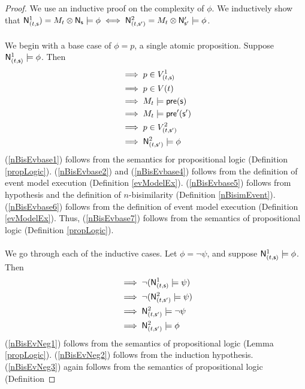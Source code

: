 \begin{proof}
We use an inductive proof on the complexity of $\phi$.
We inductively show that $\mathrm{\mathsf{N}}^1_{(t,\mathrm{\mathsf{s}}}) = M_t \otimes \mathrm{\mathsf{N}}_\mathrm{\mathsf{s}} \models \phi \iff \mathrm{\mathsf{N}}^2_{(t,\mathrm{\mathsf{s}}')} = M_t \otimes
\mathrm{\mathsf{N}}'_{\mathrm{\mathsf{s}}'} \models \phi$.\\
\\
We begin with a base case of $\phi = p$, a single atomic proposition.
Suppose $\mathrm{\mathsf{N}}^1_{(t,\mathrm{\mathsf{s}})} \models \phi$.
Then
\begin{align}
	& \implies p \in V^1_{(t,\mathrm{\mathsf{s}})} \label{nBisEvbase1} \\
	& \implies p \in V(t) \label{nBisEvbase2} \\
	& \implies M_t \models \mathrm{\mathsf{pre}}(\mathrm{\mathsf{s}}) \label{nBisEvbase4} \\
	& \implies M_t \models \mathrm{\mathsf{pre}}'(\mathrm{\mathsf{s}}') \label{nBisEvbase5} \\
	& \implies p \in V^2_{(t,\mathrm{\mathsf{s}}')} \label{nBisEvbase6}\\
	& \implies \mathrm{\mathsf{N}}^2_{(t,\mathrm{\mathsf{s}}')} \models \phi \label{nBisEvbase7}
\end{align}
(\ref{nBisEvbase1}) follows from the semantics for propositional logic (Definition \ref{propLogic}).
(\ref{nBisEvbase2}) and (\ref{nBisEvbase4}) follows from the definition of event model execution (Definition
\ref{evModelEx}).
(\ref{nBisEvbase5}) follows from hypothesis and the definition of $n$-bisimilarity (Definition
\ref{nBisimEvent}).
(\ref{nBisEvbase6}) follows from the definition of event model execution (Definition
\ref{evModelEx}).
Thus, (\ref{nBisEvbase7}) follows from the semantics of propositional logic (Definition
\ref{propLogic}).\\
\\
We go through each of the inductive cases.
Let $\phi = \neg \psi$, and suppose $\mathrm{\mathsf{N}}^1_{(t,\mathrm{\mathsf{s}})} \models \phi$.
Then
\begin{align}
	& \implies \neg (\mathrm{\mathsf{N}}^1_{(t,\mathrm{\mathsf{s}})} \models \psi) \label{nBisEvNeg1} \\
	& \implies \neg (\mathrm{\mathsf{N}}^2_{(t,\mathrm{\mathsf{s}}')} \models \psi) \label{nBisEvNeg2} \\
	& \implies \mathrm{\mathsf{N}}^2_{(t,\mathrm{\mathsf{s}}')} \models \neg \psi \label{nBisEvNeg3} \\
	& \implies \mathrm{\mathsf{N}}^2_{(t,\mathrm{\mathsf{s}}')} \models \phi \label{nBisEvNeg4}
\end{align}
(\ref{nBisEvNeg1}) follows from the semantics of propositional logic (Lemma \ref{propLogic}).
(\ref{nBisEvNeg2}) follows from the induction hypothesis.
(\ref{nBisEvNeg3}) again follows from the semantics of propositional logic (Definition

\end{proof}
